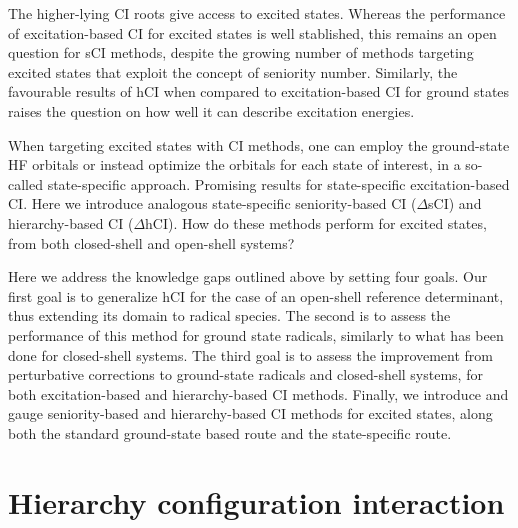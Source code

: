 \documentclass[aip,jcp,reprint,noshowkeys,superscriptaddress]{revtex4-1}
\begin{document}
The higher-lying CI roots give access to excited states.
Whereas the performance of excitation-based CI for excited states is well stablished, \cite{} this remains an open question for sCI methods,
despite the growing number of methods targeting excited states that exploit the concept of seniority number. \cite{} 
Similarly, the favourable results of hCI when compared to excitation-based CI for ground states raises the question on how well it can describe excitation energies.

When targeting excited states with CI methods, one can employ the ground-state HF orbitals or instead optimize the orbitals for each state of interest, in a so-called state-specific approach.
Promising results for state-specific excitation-based CI.
\cite{Kossoski_2023}
Here we introduce analogous state-specific seniority-based CI ($\Delta$sCI) and hierarchy-based CI ($\Delta$hCI).
How do these methods perform for excited states, from both closed-shell and open-shell systems?

Here we address the knowledge gaps outlined above by setting four goals.
Our first goal is to generalize hCI \cite{Kossoski_2022} for the case of an open-shell reference determinant, thus extending its domain to radical species.
The second is to assess the performance of this method for ground state radicals, similarly to what has been done for closed-shell systems. \cite{Kossoski_2022}
The third goal is to assess the improvement from perturbative corrections to ground-state radicals and closed-shell systems, for both excitation-based and hierarchy-based CI methods.
Finally, we introduce and gauge seniority-based and hierarchy-based CI methods for excited states, along both the standard ground-state based route and the state-specific route. \cite{Kossoski_2023}


\section{Hierarchy configuration interaction}
\label{sec:hCI}
\end{document}
